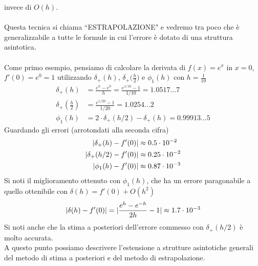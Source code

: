 \documentclass[12pt,a4paper]{article}
\DeclarePairedDelimiter{\abs}{\lvert}{\rvert}
\begin{document}
invece di $O(h)$.\\
\vspace{0.1cm}\\
Questa tecnica si chiama ``ESTRAPOLAZIONE" e vedremo tra poco che è generalizzabile a tutte le formule in cui l'errore è dotato di una struttura asintotica.\\
\vspace{0.1cm}\\
Come primo esempio, pensiamo di calcolare la derivata di $f(x)=e^x$ in $x=0$, $f'(0)=e^0=1$ utilizzando $\delta_+(h)$, $\delta_+\bigl(\frac{h}{2}\bigr)$ e $\phi_1(h)$ con $h=\frac{1}{10}$
\[
\begin{split}
    \delta_+ (h) & = \frac{e^h - e^0}{h} = \frac{e^{1/10} - 1}{1/10} = 1.0517 \dotso 7 \\
    \delta_+ (\frac{h}{2}) & = \frac{e^{1/20} - 1}{1/20} = 1.0254 \dotso 2 \\
    \phi_1 (h) & = 2 \cdot \delta_+ (h/2) - \delta_+ (h) = 0.99913 \dotso 5
\end{split}
\]
Guardando gli errori (arrotondati alla seconda cifra)
\[
\begin{split}
    \abs{\delta_+ (h) - f'(0)} & \approx 0.5 \cdot 10^{-2} \\
    \abs{\delta_+ (h/2) - f'(0)} & \approx 0.25 \cdot 10^{-2} \\
    \abs{\phi_1 (h) - f'(0)} & \approx 0.87 \cdot 10^{-3}
\end{split}
\]
Si noti il miglioramento ottenuto con $\phi_1 (h)$, che ha un
errore paragonabile a quello ottenibile con $\delta (h) = f'(0) + O(h^2)$
\[
\abs{\delta (h) - f'(0)} = \abs{\frac{e^h - e^{-h}}{2h} - 1} \approx 1.7 \cdot 10^{-3}
\]
Si noti anche che la stima a posteriori dell'errore commesso con $\delta_+ (h/2)$ è molto accurata.\\
A questo punto possiamo descrivere l'estensione a strutture asintotiche generali del metodo di stima a posteriori e del metodo di estrapolazione.\\
\end{document}
